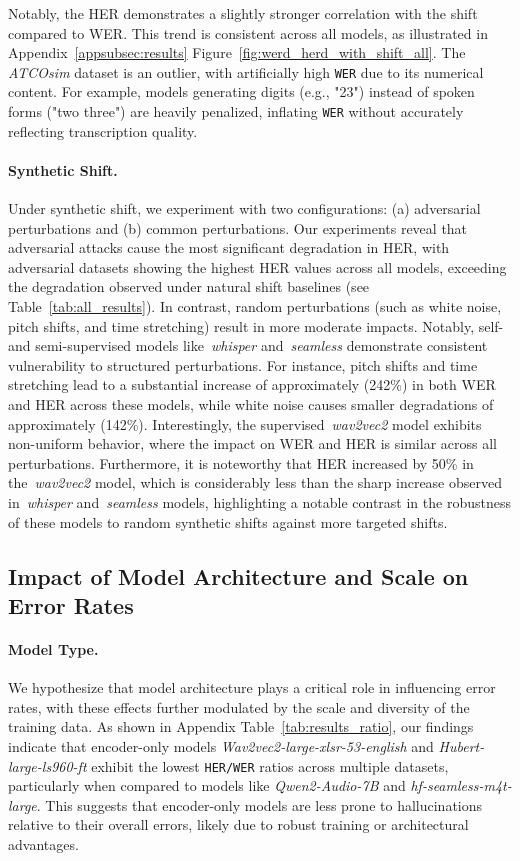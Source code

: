 Notably, the HER demonstrates a slightly stronger correlation with the shift compared to WER. This trend is consistent across all models, as illustrated in Appendix~\ref{appsubsec:results} Figure~\ref{fig:werd_herd_with_shift_all}. The \emph{ATCOsim} dataset is an outlier, with artificially high \texttt{WER} due to its numerical content. For example, models generating digits (e.g., "23") instead of spoken forms ("two three") are heavily penalized, inflating \texttt{WER} without accurately reflecting transcription quality.

\paragraph{Synthetic Shift.}
Under synthetic shift, we experiment with two configurations: (a) adversarial perturbations and (b) common perturbations. Our experiments reveal that adversarial attacks cause the most significant degradation in HER, with adversarial datasets showing the highest HER values across all models, exceeding the degradation observed under natural shift baselines (see Table~\ref{tab:all_results}). In contrast, random perturbations (such as white noise, pitch shifts, and time stretching) result in more moderate impacts. Notably, self- and semi-supervised models like~\emph{whisper} and~\emph{seamless} demonstrate consistent vulnerability to structured perturbations. For instance, pitch shifts and time stretching lead to a substantial increase of approximately (242\%) in both WER and HER across these models, while white noise causes smaller degradations of approximately (142\%). Interestingly, the supervised~\emph{wav2vec2} model exhibits non-uniform behavior, where the impact on WER and HER is similar across all perturbations. Furthermore, it is noteworthy that HER increased by 50\% in the~\emph{wav2vec2} model, which is considerably less than the sharp increase observed in~\emph{whisper} and~\emph{seamless} models, highlighting a notable contrast in the robustness of these models to random synthetic shifts against more targeted shifts.



\subsection{Impact of Model Architecture and Scale on Error Rates}
\paragraph{Model Type.} We hypothesize that model architecture plays a critical role in influencing error rates, with these effects further modulated by the scale and diversity of the training data. As shown in Appendix Table~\ref{tab:results_ratio}, our findings indicate that encoder-only models \emph{Wav2vec2-large-xlsr-53-english} and \emph{Hubert-large-ls960-ft} exhibit the lowest \texttt{HER/WER} ratios across multiple datasets, particularly when compared to models like \emph{Qwen2-Audio-7B} and \emph{hf-seamless-m4t-large}. This suggests that encoder-only models are less prone to hallucinations relative to their overall errors, likely due to robust training or architectural advantages.

